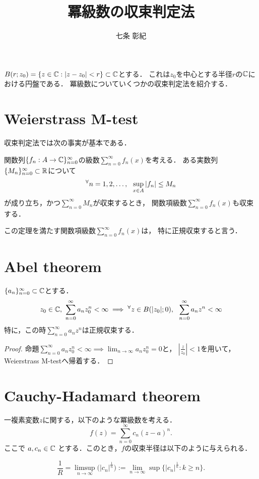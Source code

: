 \documentclass[a4paper]{jsarticle}
\title{冪級数の収束判定法}
\author{七条 彰紀}
\begin{document}
    \maketitle

    $B(r;z_0)=\{ z \in \mathbb{C} : |z-z_0|<r \} \subset \mathbb{C}$とする．
    これは$z_0$を中心とする半径$r$の$\mathbb{C}$における円盤である．
    冪級数についていくつかの収束判定法を紹介する．

    \section{Weierstrass M-test}
    収束判定法では次の事実が基本である．
    \begin{Them}
        関数列$\{f_n: A \to \mathbb{C}\}_{n=0}^{\infty}$の級数$\sum_{n=0}^{\infty} f_n(x)$を考える．
        ある実数列$\{M_n\}_{n=0}^{\infty} \subset \mathbb{R}$について
        \[ {}^{\forall} n=1,2,\dots,~~ \sup_{x \in A} |f_n| \leq M_n \]
        が成り立ち，かつ$\sum_{n=0}^{\infty} M_n$が収束するとき，
        関数項級数$\sum_{n=0}^{\infty} f_n(x)$も収束する．
    \end{Them}
    この定理を満たす関数項級数$\sum_{n=0}^{\infty} f_n(x)$は，
    特に正規収束すると言う．

    \section{Abel theorem}
        \begin{Them}
            $\{a_n\}_{n=0}^{\infty} \subset \mathbb{C}$とする．
            \[
                z_0 \in \mathbb{C},~ \sum_{n=0}^{\infty}{a_n z^n_0} < \infty
                \implies
                {}^{\forall} z \in B(|z_0|; 0),~~ \sum_{n=0}^{\infty}{a_n z^n} < \infty
            \]
            特に，この時$\sum_{n=0}^{\infty}{a_n z^n}$は正規収束する．
        \end{Them}
        \begin{proof}
            命題$\sum_{n=0}^{\infty}{a_n z^n_0} < \infty \implies \lim_{n \to \infty}{a_n z^n_0}=0$と，
            $|\frac{z}{z_0}|<1$を用いて，Weierstrass M-testへ帰着する．
        \end{proof}

    \section{Cauchy-Hadamard theorem}
        \begin{Them}
        一複素変数$z$に関する，以下のような冪級数を考える．
        \[ f(z) = \sum_{n = 0}^{\infty} c_{n} (z-a)^{n}. \]
        ここで $a, c_n \in \mathbb{C}$ とする．このとき，$f$の収束半径は以下のように与えられる．

        \[
            \frac{1}{R}=\limsup_{n \to \infty} \big( | c_{n} |^\frac{1}{n} \big)
            :=\lim_{n\to\infty}\sup\{| c_{n} |^\frac{1}{n} : k\geq n\}.\]
        \end{Them}
\end{document}
